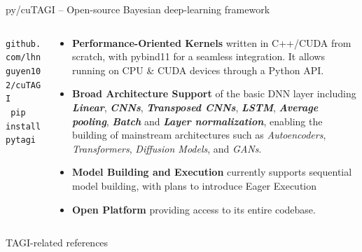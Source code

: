 \documentclass[final]{beamer}
\begin{document}
\begin{frame}[t]
\begin{columns}
\begin{column}[T]{.31\textwidth}
\begin{block}{py/cuTAGI -- Open-source Bayesian deep-learning framework}
\begin{columns}
\begin{column}{.35\textwidth}
{\texttt{github\!.\!com/lhnguyen102/\!cuTAGI}}\\[20pt]
{\Large\texttt{\alert{ pip install pytagi}}}
\end{column}
\begin{column}{.6\textwidth}
\begin{itemize}
\item \alert{\bf Performance-Oriented Kernels} written in C++/CUDA from scratch, with pybind11 for a seamless integration. It allows running on CPU \& CUDA devices through a Python API.
\item \alert{\bf Broad Architecture Support} of the basic DNN layer including \emph{\color{darkblue}\bf Linear}, \emph{\color{cyan}\bf CNNs}, \emph{\color{blue}\bf Transposed CNNs}, \emph{\color{magenta}\bf LSTM}, \emph{\color{orange}\bf Average pooling}, \emph{\color{teal}\bf Batch} and \emph{\color{violet}\bf Layer normalization}, enabling the building of mainstream architectures such as \emph{Autoencoders}, \emph{Transformers}, \emph{Diffusion Models}, and \emph{GANs}.
\item \alert{\bf Model Building and Execution} currently supports sequential model building, with plans to introduce Eager Execution
\item \alert{\bf Open Platform} providing access to its entire codebase. 
\end{itemize}


\end{column}
\end{columns}
\end{block}%
\vspace{-5mm}


 
\begin{block}{TAGI-related references}\vspace{10pt}



\end{block}
\end{column}
\end{columns}
\end{frame}
\end{document}
